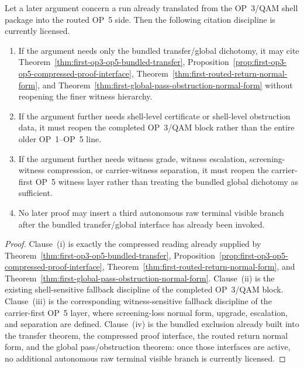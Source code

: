 \begin{proposition}
\label{prop:citation-reopening-rule-bundled-op3-op5-global}
Let a later argument concern a run already translated from the OP~3/QAM shell package into the routed OP~5 side. Then the following citation discipline is currently licensed.
\begin{enumerate}[leftmargin=2em,label=(\roman*)]
 \item If the argument needs only the bundled transfer/global dichotomy, it may cite Theorem~\ref{thm:first-op3-op5-bundled-transfer}, Proposition~\ref{prop:first-op3-op5-compressed-proof-interface}, Theorem~\ref{thm:first-routed-return-normal-form}, and Theorem~\ref{thm:first-global-pass-obstruction-normal-form} without reopening the finer witness hierarchy.
 \item If the argument further needs shell-level certificate or shell-level obstruction data, it must reopen the completed OP~3/QAM block rather than the entire older OP~1--OP~5 line.
 \item If the argument further needs witness grade, witness escalation, screening-witness compression, or carrier-witness separation, it must reopen the carrier-first OP~5 witness layer rather than treating the bundled global dichotomy as sufficient.
 \item No later proof may insert a third autonomous raw terminal visible branch after the bundled transfer/global interface has already been invoked.
\end{enumerate}
\end{proposition}

\begin{proof}
Clause~(i) is exactly the compressed reading already supplied by Theorem~\ref{thm:first-op3-op5-bundled-transfer}, Proposition~\ref{prop:first-op3-op5-compressed-proof-interface}, Theorem~\ref{thm:first-routed-return-normal-form}, and Theorem~\ref{thm:first-global-pass-obstruction-normal-form}. Clause~(ii) is the existing shell-sensitive fallback discipline of the completed OP~3/QAM block. Clause~(iii) is the corresponding witness-sensitive fallback discipline of the carrier-first OP~5 layer, where screening-loss normal form, upgrade, escalation, and separation are defined. Clause~(iv) is the bundled exclusion already built into the transfer theorem, the compressed proof interface, the routed return normal form, and the global pass/obstruction theorem: once those interfaces are active, no additional autonomous raw terminal visible branch is currently licensed.
\end{proof}

